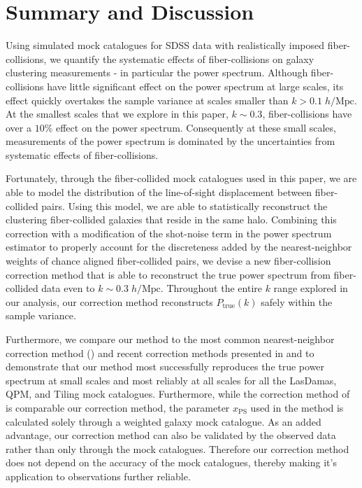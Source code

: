 \documentclass{emulateapj}
\begin{document}
\section{Summary and Discussion} \label{sec:summary}
Using simulated mock catalogues for SDSS data with realistically imposed fiber-collisions, we quantify the systematic effects of fiber-collisions on galaxy clustering measurements - in particular the power spectrum. Although fiber-collisions have little significant effect on the power spectrum at large scales, its effect quickly overtakes the sample variance at scales smaller than $k > 0.1 \;h/\mathrm{Mpc}$. At the smallest scales that we explore in this paper, $k \sim 0.3$, fiber-collisions have over a $10 \%$ effect on the power spectrum. Consequently at these small scales, measurements of the power spectrum is dominated by the uncertainties from systematic effects of fiber-collisions. 

Fortunately, through the fiber-collided mock catalogues used in this paper, we are able to model the distribution of the line-of-sight displacement between fiber-collided pairs. Using this model, we are able to statistically reconstruct the clustering fiber-collided galaxies that reside in the same halo. Combining this correction with a modification of the shot-noise term in the power spectrum estimator to properly account for the discreteness added by the nearest-neighbor weights of chance aligned fiber-collided pairs, we devise a new fiber-collision correction method that is able to reconstruct the true power spectrum from fiber-collided data even to $k \sim 0.3 \;h/\mathrm{Mpc}$. Throughout the entire $k$ range explored in our analysis, our correction method reconstructs $P_\mathrm{true}(k)$ safely within the sample variance. 

Furthermore, we compare our method to the most common nearest-neighbor correction method (\citealt{Zehavi:2002aa, Berlind:2006aa, Anderson:2012aa}) and recent correction methods presented in \cite{Beutler:2014aa} and \cite{Gil-Marin:2014aa} to demonstrate that our method most successfully reproduces the true power spectrum at small scales and most reliably at all scales for all the LasDamas, QPM, and Tiling mock catalogues. Furthermore, while the correction method of \cite{Gil-Marin:2014aa} is comparable our correction method, the parameter $x_\mathrm{PS}$ used in the method is calculated solely through a weighted galaxy mock catalogue. As an added advantage, our correction method can also be validated by the observed data rather than only through the mock catalogues. Therefore our correction method does not depend on the accuracy of the mock catalogues, thereby making it's application to observations further reliable. 
\end{document}
